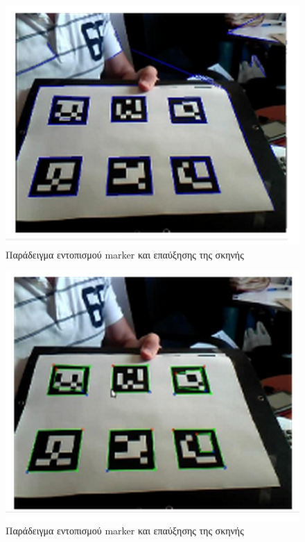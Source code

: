 \begin{figure}[H]
    \centering
    \includegraphics[scale=0.6, angle=0]{Files/Figures/aruco3.png}
    \caption[Παράδειγμα εντοπισμού marker και επαύξησης της σκηνής \cite{howmarkerswork}]{ Παράδειγμα εντοπισμού marker και επαύξησης της σκηνής \cite{howmarkerswork}}
    \label{fig:aruco3}
\end{figure}


\begin{figure}[H]
    \centering
    \includegraphics[scale=0.6, angle=0]{Files/Figures/aruco4.png}
    \caption[Παράδειγμα εντοπισμού marker και επαύξησης της σκηνής \cite{howmarkerswork}]{ Παράδειγμα εντοπισμού marker και επαύξησης της σκηνής \cite{howmarkerswork}}
    \label{fig:aruco4}
\end{figure}


